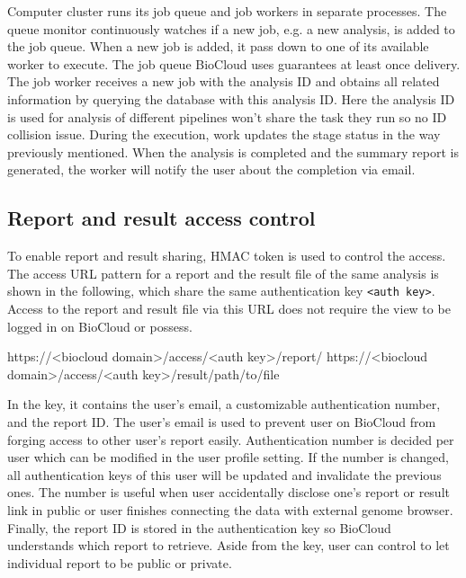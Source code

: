 Computer cluster runs its job queue and job workers in separate processes. The
queue monitor continuously watches if a new job, e.g. a new analysis, is added
to the job queue. When a new job is added, it pass down to one of its available
worker to execute. The job queue BioCloud uses guarantees at least once
delivery. The job worker receives a new job with the analysis ID and obtains
all related information by querying the database with this analysis ID. Here
the analysis ID is used for analysis of different pipelines won't share the
task they run so no ID collision issue. During the execution, work updates the
stage status in the way previously mentioned. When the analysis is completed
and the summary report is generated, the worker will notify the user about the
completion via email.


\subsection{Report and result access control}

To enable report and result sharing, HMAC token is used to control the access.
The access URL pattern for a report and the result file of the same analysis is
shown in the following, which share the same authentication key \texttt{<auth
key>}. Access to the report and result file via this URL does not require the
view to be logged in on BioCloud or possess.

\begin{CVerbatim}[fontsize=\small]
https://<biocloud domain>/access/<auth key>/report/
https://<biocloud domain>/access/<auth key>/result/path/to/file
\end{CVerbatim}

In the key, it contains the user's email, a customizable authentication number,
and the report ID. The user's email is used to prevent user on BioCloud from
forging access to other user's report easily. Authentication number is decided
per user which can be modified in the user profile setting. If the number is
changed, all authentication keys of this user will be updated and invalidate the
previous ones. The number is useful when user accidentally disclose one's
report or result link in public or user finishes connecting the data with
external genome browser. Finally, the report ID is stored in the authentication
key so BioCloud understands which report to retrieve. Aside from the key, user
can control to let individual report to be public or private.

